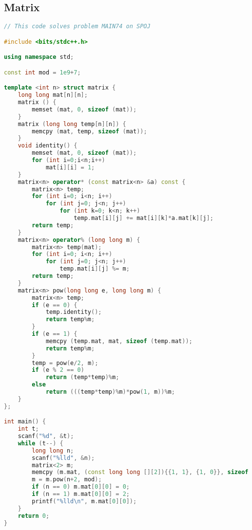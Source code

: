 \documentclass{article}
\begin{document}
\subsection{Matrix}
\begin{lstlisting}[language=C++]
// This code solves problem MAIN74 on SPOJ

#include <bits/stdc++.h>

using namespace std;

const int mod = 1e9+7;

template <int n> struct matrix {
	long long mat[n][n];
	matrix () {
		memset (mat, 0, sizeof (mat));
	}
	matrix (long long temp[n][n]) {
		memcpy (mat, temp, sizeof (mat));
	}
	void identity() {
		memset (mat, 0, sizeof (mat));
		for (int i=0;i<n;i++)
			mat[i][i] = 1;
	}
	matrix<n> operator* (const matrix<n> &a) const {
		matrix<n> temp;
		for (int i=0; i<n; i++)
			for (int j=0; j<n; j++)
				for (int k=0; k<n; k++)
					temp.mat[i][j] += mat[i][k]*a.mat[k][j];
		return temp;
	}
	matrix<n> operator% (long long m) {
		matrix<n> temp(mat);
		for (int i=0; i<n; i++)
			for (int j=0; j<n; j++)
				temp.mat[i][j] %= m;
		return temp;
	}
	matrix<n> pow(long long e, long long m) {
		matrix<n> temp;
		if (e == 0) {
			temp.identity();
			return temp%m;
		}
		if (e == 1) {
			memcpy (temp.mat, mat, sizeof (temp.mat));
			return temp%m;
		}
		temp = pow(e/2, m);
		if (e % 2 == 0)
			return (temp*temp)%m;
		else
			return (((temp*temp)%m)*pow(1, m))%m;
	}
};

int main() {
	int t;
	scanf("%d", &t);
	while (t--) {
		long long n;
		scanf("%lld", &n);
		matrix<2> m;
		memcpy (m.mat, (const long long [][2]){{1, 1}, {1, 0}}, sizeof (m.mat));
		m = m.pow(n+2, mod);
		if (n == 0) m.mat[0][0] = 0;
		if (n == 1) m.mat[0][0] = 2;
		printf("%lld\n", m.mat[0][0]);
	}
    return 0;
}

\end{lstlisting}
\end{document}
